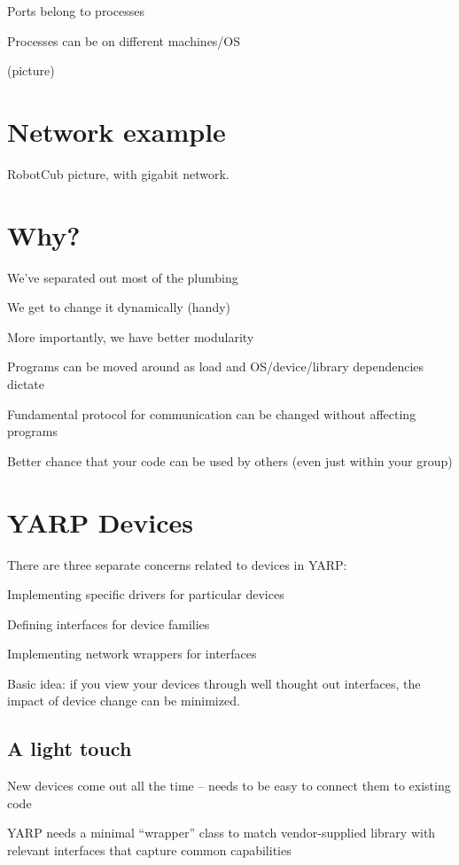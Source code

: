 Ports belong to processes

Processes can be on different machines/OS

(picture)

\section{Network example}

RobotCub picture, with gigabit network.

\section{Why?}

We've separated out most of the plumbing

We get to change it dynamically (handy)

More importantly, we have better modularity

Programs can be moved around as load and OS/device/library
 dependencies dictate

Fundamental protocol for communication can be changed without 
affecting programs

Better chance that your code can be used by others (even just within 
your group)


\section{YARP Devices}

There are three separate concerns related to devices in YARP:

Implementing specific drivers for particular devices 

Defining interfaces for device families 

Implementing network wrappers for interfaces

Basic idea: if you view your devices through well thought out
interfaces, the impact of device change can be minimized.


\subsection{A light touch}

New devices come out all the time -- needs to be easy to connect them
to existing code

YARP needs a minimal ``wrapper'' class to match vendor-supplied
library with relevant interfaces that capture common capabilities

